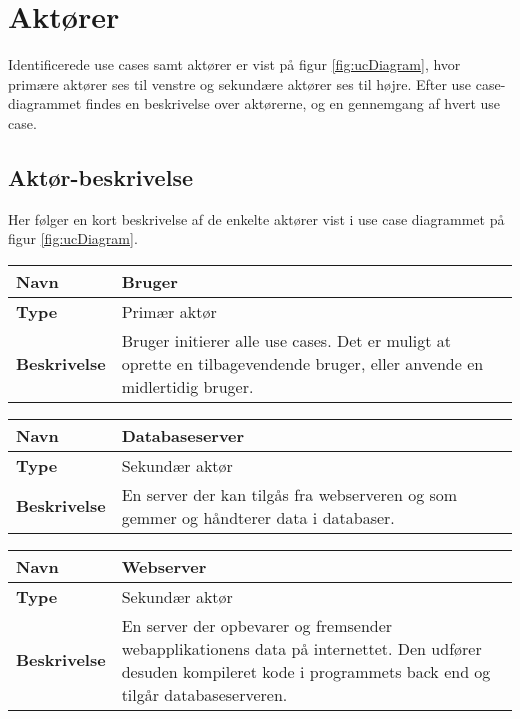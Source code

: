 \section{Aktører}

Identificerede use cases samt aktører er vist på figur \ref{fig:ucDiagram}, hvor primære aktører ses til venstre og sekundære aktører ses til højre. Efter use case-diagrammet findes en beskrivelse over aktørerne, og en gennemgang af hvert use case. 




\subsection{Aktør-beskrivelse}
Her følger en kort beskrivelse af de enkelte aktører vist i use case diagrammet på figur \ref{fig:ucDiagram}.

\begin{tabular}{|p{2cm}|p{12cm}|}

\hline 
\textbf{Navn} & Bruger \\ 
\hline 
\textbf{Type} & Primær aktør \\ 
\hline 
\textbf{Beskrivelse} & Bruger initierer alle use cases. Det er muligt at oprette en tilbagevendende bruger, eller anvende en midlertidig bruger.\\ 
\hline 

\end{tabular} 

\begin{tabular}{|p{2cm}|p{12cm}|}

\hline 
\textbf{Navn} & Databaseserver \\ 
\hline 
\textbf{Type} & Sekundær aktør \\ 
\hline 
\textbf{Beskrivelse} & En server der kan tilgås fra webserveren og som gemmer og håndterer data i databaser.\\ 
\hline 

\end{tabular} 

\begin{tabular}{|p{2cm}|p{12cm}|}

\hline 
\textbf{Navn} & Webserver \\ 
\hline 
\textbf{Type} & Sekundær aktør \\ 
\hline 
\textbf{Beskrivelse} & En server der opbevarer og fremsender webapplikationens data på internettet. Den udfører desuden kompileret kode i programmets back end og tilgår databaseserveren. \\ 
\hline 

\end{tabular} 